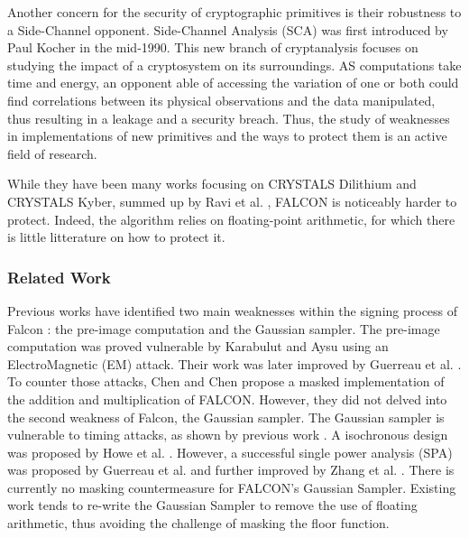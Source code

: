 \documentclass[runningheads]{llncs}
\begin{document}
\medskip

\noindent Another concern for the security of cryptographic primitives is their robustness to a Side-Channel opponent. Side-Channel Analysis (SCA) was first introduced by Paul Kocher \cite{10.1007/3-540-68697-5_9} in the mid-1990. This new branch of cryptanalysis focuses on studying the impact of a cryptosystem on its surroundings. AS computations take time and energy, an opponent able of accessing the variation of one or both could find correlations between its physical observations and the data manipulated, thus resulting in a leakage and a security breach. Thus, the study of weaknesses in implementations of new primitives and the ways to protect them is an active field of research.

\medskip 

\noindent While they have been many works focusing on CRYSTALS Dilithium and CRYSTALS Kyber, summed up by Ravi et al. \cite{10.1145/3603170}, FALCON is noticeably harder to protect. Indeed, the algorithm relies on floating-point arithmetic, for which there is little litterature on how to protect it.
%
\subsubsection{Related Work} Previous works have identified two main weaknesses within the signing process of Falcon : the pre-image computation and the Gaussian sampler. The pre-image computation was proved vulnerable by Karabulut and Aysu \cite{9586131} using an ElectroMagnetic (EM) attack. Their work was later improved by Guerreau et al. \cite{Guerreau_Martinelli_Ricosset_Rossi_2022}. To counter those attacks, Chen and Chen \cite{Chen_Chen_2024} propose a masked implementation of the addition and multiplication of FALCON. However, they did not delved into the second weakness of Falcon, the Gaussian sampler.\newline
The Gaussian sampler is vulnerable to timing attacks, as shown by previous work \cite{10.1007/978-3-662-53140-2_16,10.1145/3133956.3134028,cryptoeprint:2019/478,10.1145/3133956.3134023}. A isochronous design was proposed by Howe et al. \cite{10.1007/978-3-030-44223-1_4}. However, a successful single power analysis (SPA) was proposed by Guerreau et al. \cite{Guerreau_Martinelli_Ricosset_Rossi_2022} and further improved by Zhang et al. \cite{10.1007/978-3-031-30634-1_19}. There is currently no masking countermeasure for FALCON's Gaussian Sampler. Existing work \cite{10.1007/978-3-031-07082-2_9} tends to re-write the Gaussian Sampler to remove the use of floating arithmetic, thus avoiding the challenge of masking the floor function. 
%
\end{document}
